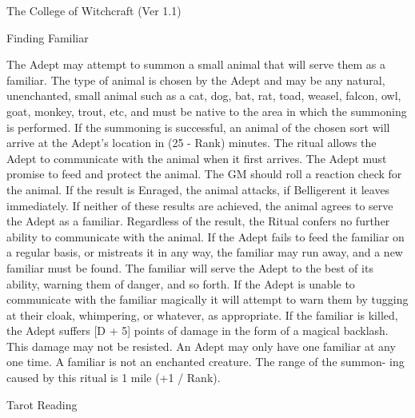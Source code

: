 \begin{Chapter}{The College of Witchcraft (Ver 1.1)}
\begin{ritual}[Q-1]{Finding Familiar}
\begin{effects}
The Adept may attempt to summon a small animal that will serve them as
a familiar. The type of animal is chosen by the Adept and may be any
natural, unenchanted, small animal such as a cat, dog, bat, rat, toad,
weasel, falcon, owl, goat, monkey, trout, etc, and must be native to
the area in which the summoning is performed.  If the summoning is
successful, an animal of the chosen sort will arrive at the Adept’s
location in (25 - Rank) minutes.  The ritual allows the Adept to
communicate with the animal when it first arrives.  The Adept must
promise to feed and protect the animal.  The GM should roll a reaction
check for the animal.  If the result is Enraged, the animal attacks,
if Belligerent it leaves immediately.  If neither of these results are
achieved, the animal agrees to serve the Adept as a familiar.
Regardless of the result, the Ritual confers no further ability to
communicate with the animal. If the Adept fails to feed the familiar
on a regular basis, or mistreats it in any way, the familiar may run
away, and a new familiar must be found.  The familiar will serve the
Adept to the best of its ability, warning them of danger, and so
forth.  If the Adept is unable to communicate with the familiar
magically it will attempt to warn them by tugging at their cloak,
whimpering, or whatever, as appropriate.  If the familiar is killed,
the Adept suffers [D + 5] points of damage in the form of a magical
backlash. This damage may not be resisted.  An Adept may only have one
familiar at any one time. A familiar is not an enchanted creature.
The range of the summon- ing caused by this ritual is 1 mile (+1 /
Rank).
\end{effects}
\end{ritual}

\begin{ritual}[Q-2]{Tarot Reading}


\end{ritual}
\end{Chapter}
